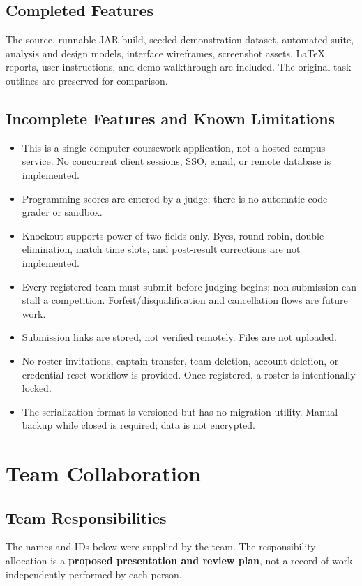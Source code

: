 \subsection{Completed Features}
The source, runnable JAR build, seeded demonstration dataset, automated suite, analysis and design models, interface wireframes, screenshot assets, LaTeX reports, user instructions, and demo walkthrough are included. The original task outlines are preserved for comparison.
\subsection{Incomplete Features and Known Limitations}
\begin{itemize}
\item This is a single-computer coursework application, not a hosted campus service. No concurrent client sessions, SSO, email, or remote database is implemented.
\item Programming scores are entered by a judge; there is no automatic code grader or sandbox.
\item Knockout supports power-of-two fields only. Byes, round robin, double elimination, match time slots, and post-result corrections are not implemented.
\item Every registered team must submit before judging begins; non-submission can stall a competition. Forfeit/disqualification and cancellation flows are future work.
\item Submission links are stored, not verified remotely. Files are not uploaded.
\item No roster invitations, captain transfer, team deletion, account deletion, or credential-reset workflow is provided. Once registered, a roster is intentionally locked.
\item The serialization format is versioned but has no migration utility. Manual backup while closed is required; data is not encrypted.
\end{itemize}

\clearpage\section{Team Collaboration}
\subsection{Team Responsibilities}
The names and IDs below were supplied by the team. The responsibility allocation is a \textbf{proposed presentation and review plan}, not a record of work independently performed by each person.

